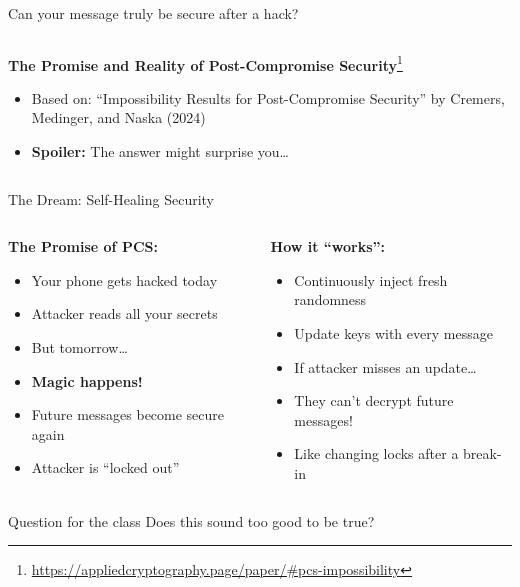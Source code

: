 \documentclass[aspectratio=169, lualatex, handout]{beamer}
\begin{document}
\begin{frame}{Can your message truly be secure after a hack?}
	\begin{columns}[c]
		\begin{column}{1\textwidth}
			\begin{center}
				\Large \textbf{The Promise and Reality of Post-Compromise Security}\footnote{\url{https://appliedcryptography.page/paper/\#pcs-impossibility}}
			\end{center}
			\vspace{1em}
			\begin{itemize}
				\item Based on: ``Impossibility Results for Post-Compromise Security'' by Cremers, Medinger, and Naska (2024)
				\item \textbf{Spoiler:} The answer might surprise you\ldots
			\end{itemize}
		\end{column}
	\end{columns}
\end{frame}

\begin{frame}{The Dream: Self-Healing Security}
	\begin{columns}[c]
		\begin{column}{0.5\textwidth}
			\textbf{The Promise of PCS:}
			\begin{itemize}
				\item Your phone gets hacked today
				\item Attacker reads all your secrets
				\item But tomorrow\ldots
				\item \textbf{Magic happens!}
				\item Future messages become secure again
				\item Attacker is ``locked out''
			\end{itemize}
		\end{column}
		\begin{column}{0.5\textwidth}
			\textbf{How it ``works'':}
			\begin{itemize}
				\item Continuously inject fresh randomness
				\item Update keys with every message
				\item If attacker misses an update\ldots
				\item They can't decrypt future messages!
				\item Like changing locks after a break-in
			\end{itemize}
		\end{column}
	\end{columns}
	\begin{alertblock}{Question for the class}
		Does this sound too good to be true?
	\end{alertblock}
\end{frame}
\end{document}
